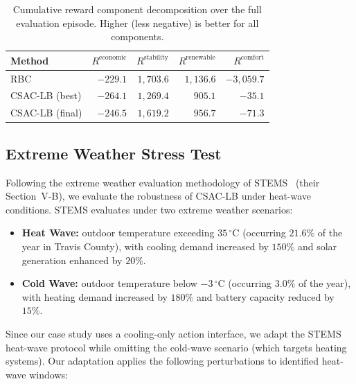 \begin{table}[htbp]
\centering
\caption{Cumulative reward component decomposition over the full evaluation
  episode.  Higher (less negative) is better for all components.}
\label{tab:temp-reward-decomposition}
\begin{tabular}{lrrrr}
\toprule
\textbf{Method}
  & $R^{\text{economic}}$
  & $R^{\text{stability}}$
  & $R^{\text{renewable}}$
  & $R^{\text{comfort}}$ \\
\midrule
RBC
  & $-229.1$ & $1{,}703.6$ & $1{,}136.6$ & $-3{,}059.7$ \\
CSAC-LB (best)
  & $-264.1$ & $1{,}269.4$ & $905.1$ & $-35.1$ \\
CSAC-LB (final)
  & $-246.5$ & $1{,}619.2$ & $956.7$ & $-71.3$ \\
\bottomrule
\end{tabular}
\end{table}


\subsection{Extreme Weather Stress Test}
\label{sec:temp-results-heatwave}

Following the extreme weather evaluation methodology of
STEMS~\cite{zhang2025stems} (their Section~V-B), we evaluate the robustness
of CSAC-LB under heat-wave conditions.  STEMS evaluates under two extreme
weather scenarios:

\begin{itemize}
  \item \textbf{Heat Wave:} outdoor temperature exceeding $35\,^\circ$C
    (occurring $21.6\%$ of the year in Travis County), with cooling demand
    increased by $150\%$ and solar generation enhanced by $20\%$.
  \item \textbf{Cold Wave:} outdoor temperature below $-3\,^\circ$C
    (occurring $3.0\%$ of the year), with heating demand increased by $180\%$
    and battery capacity reduced by $15\%$.
\end{itemize}

Since our case study uses a cooling-only action interface, we adapt the STEMS
heat-wave protocol while omitting the cold-wave scenario (which targets heating
systems).  Our adaptation applies the following perturbations to identified
heat-wave windows:

